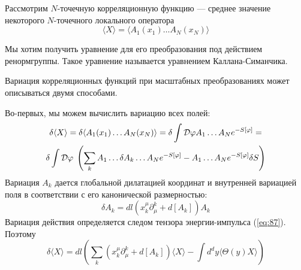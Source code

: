 \documentclass[a4paper,12pt]{article} \usepackage[utf8x]{inputenc} \usepackage[russian]{babel}
\theoremstyle{definition} \newtheorem{corollary}{Corollary}[theorem] \theoremstyle{definition}
\begin{document}
Рассмотрим $N$-точечную корреляционную функцию --- среднее значение некоторого $N$-точечного
локального оператора
\begin{equation}
  \label{eq:81} \langle X\rangle =\langle A_1 (x_1)\dots A_N (x_N)\rangle
\end{equation}

Мы хотим получить уравнение для его преобразования под действием ренормгруппы. Такое уравнение
называется уравнением Каллана-Симанчика.

Вариация корреляционных функций при масштабных преобразованиях может описываться двумя способами.

Во-первых, мы можем вычислить вариацию всех полей:
\begin{multline}
  \label{eq:82} \delta \langle X\rangle=\delta \langle A_1(x_1)\dots A_N (x_N)\rangle = \delta \int
{\cal D}\varphi A_1 \dots A_N e^{-S[\varphi]} = \\ \delta \int {\cal D} \varphi\; \left( \sum_k A_1
\dots \delta A_k \dots A_N e^{-S[\varphi]} -A_1\dots A_N e^{-S[\varphi]}\delta S\right)
\end{multline} Вариация $A_k$ дается глобальной дилатацией координат и внутренней вариацией поля в
соответствии с его канонической размерностью:
\begin{equation}
  \label{eq:88} \delta A_k=dl (x^{\mu}_k\partial^k_{\mu}+d[A_k]) A_k
\end{equation} Вариация действия определяется следом тензора энергии-импульса (\ref{eq:87}). Поэтому
\begin{equation}
  \label{eq:89} \delta\langle X\rangle=dl \left(\sum_k (x_k^{\mu}\partial_{\mu}^k+d[A_k])\langle
X\rangle-\int d^d y \langle\Theta(y)X\rangle\right)
\end{equation}
\end{document}
